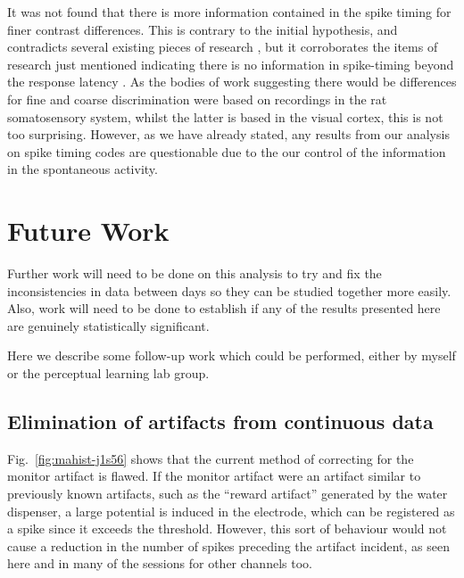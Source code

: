 It was not found that there is more information contained in the spike timing for finer contrast differences. This is contrary to the initial hypothesis, and contradicts several existing pieces of research \cite{Reich2001,Arabzadeh2006}, but it corroborates the items of research just mentioned indicating there is no information in spike-timing beyond the response latency \cite{Reich2001,Tovee1993,Rolls2011}.
As the bodies of work suggesting there would be differences for fine and coarse discrimination were based on recordings in the rat somatosensory system, whilst the latter is based in the visual cortex, this is not too surprising.
However, as we have already stated, any results from our analysis on spike timing codes are questionable due to the our control of the information in the spontaneous activity.

\section{Future Work}

Further work will need to be done on this analysis to try and fix the inconsistencies in data between days so they can be studied together more easily. Also, work will need to be done to establish if any of the results presented here are genuinely statistically significant.

Here we describe some follow-up work which could be performed, either by myself or the perceptual learning lab group.

\subsection{Elimination of artifacts from continuous data}

Fig.~\ref{fig:mahist-j1s56} shows that the current method of correcting for the monitor artifact is flawed.
If the monitor artifact were an artifact similar to previously known artifacts, such as the ``reward artifact'' generated by the water dispenser, a large potential is induced in the electrode, which can be registered as a spike since it exceeds the threshold. However, this sort of behaviour would not cause a reduction in the number of spikes preceding the artifact incident, as seen here and in many of the sessions for other channels too.

